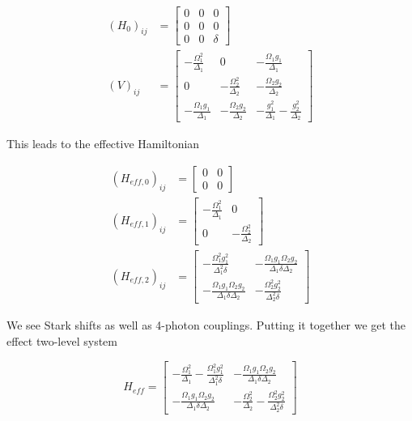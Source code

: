 \documentclass[12pt]{article}
\begin{document}
\begin{equation}
\begin{split}
(H_0)_{ij} &= \begin{bmatrix}
0 & 0 & 0\\ 0 & 0 & 0\\0 & 0 & \delta
\end{bmatrix}\\
(V)_{ij} &= \begin{bmatrix}
-\frac{\Omega_1^2}{\Delta_1} & 0 & -\frac{\Omega_1g_1}{\Delta_1}\\
0 & -\frac{\Omega_2^2}{\Delta_2} & -\frac{\Omega_2g_2}{\Delta_2}\\
-\frac{\Omega_1g_1}{\Delta_1} & -\frac{\Omega_2g_2}{\Delta_2} & - \frac{g_1^2}{\Delta_1} - \frac{g_2^2}{\Delta_2}
\end{bmatrix}
\end{split}
\end{equation}

This leads to the effective Hamiltonian

\begin{equation}
\begin{split}
(H_{eff,0})_{ij} &= \begin{bmatrix}
0 & 0\\
0 & 0
\end{bmatrix}\\
(H_{eff,1})_{ij} &= \begin{bmatrix}
-\frac{\Omega_1^2}{\Delta_1} & 0\\
0 & -\frac{\Omega_2^2}{\Delta_2}
\end{bmatrix}\\
(H_{eff,2})_{ij} &= \begin{bmatrix}
-\frac{\Omega_1^2g_1^2}{\Delta_1^2\delta} & -\frac{\Omega_1g_1\Omega_2g_2}{\Delta_1\delta\Delta_2}\\
-\frac{\Omega_1g_1\Omega_2g_2}{\Delta_1\delta\Delta_2} & -\frac{\Omega_2^2g_2^2}{\Delta_2^2\delta}
\end{bmatrix}
\end{split}
\end{equation}

We see Stark shifts as well as 4-photon couplings. Putting it together we get the effect two-level system

\begin{equation}
H_{eff} = \begin{bmatrix}
-\frac{\Omega_1^2}{\Delta_1}-\frac{\Omega_1^2g_1^2}{\Delta_1^2\delta} & -\frac{\Omega_1g_1\Omega_2g_2}{\Delta_1\delta\Delta_2}\\
-\frac{\Omega_1g_1\Omega_2g_2}{\Delta_1\delta\Delta_2} & -\frac{\Omega_2^2}{\Delta_2}-\frac{\Omega_2^2g_2^2}{\Delta_2^2\delta}
\end{bmatrix}
\end{equation}
\end{document}
